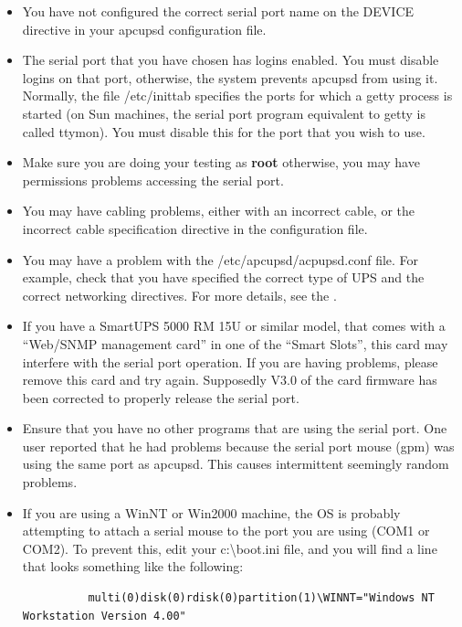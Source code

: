 {{{{{{{{{\begin{itemize}
\item You have not configured the correct serial port name on the DEVICE
   directive in your apcupsd configuration file.  
\item The serial port that you have chosen has logins enabled. You must
   disable logins on that port, otherwise, the system prevents apcupsd from using
   it. Normally, the file /etc/inittab specifies the ports for which a getty
process is started (on Sun machines, the serial port program equivalent to
getty is called ttymon). You must disable this for the port that you wish to
use.  
\item Make sure you are doing your testing as {\bf root} otherwise, you may
   have permissions problems accessing the serial port.  
\item You may have cabling problems, either with an incorrect cable, or the
   incorrect cable specification directive in the configuration file.  
\item You may have a problem with the /etc/apcupsd/acpupsd.conf file. For
   example, check that you have specified the correct type of UPS and the correct
   networking directives.  For more details, see the 
.  
\item If you have a SmartUPS 5000 RM 15U or similar model, that comes with a
   ``Web/SNMP management card'' in one of the ``Smart Slots'', this card may
   interfere with the serial port operation. If you are having problems, please
remove this card and try again. Supposedly V3.0 of the card firmware has been
corrected to properly release the serial port.  
\item Ensure that you have no other programs that are using the serial port.
   One user reported that he had problems because the serial port mouse (gpm) was
   using the same port as apcupsd. This causes intermittent seemingly random
problems.  
\item If you are using a WinNT or Win2000 machine, the OS is probably
   attempting to attach a serial mouse to the port you are using (COM1 or COM2).
   To prevent this, edit your c:\textbackslash{}boot.ini file, and you will find
a line that looks something like the following:  

\footnotesize
\begin{verbatim}
          multi(0)disk(0)rdisk(0)partition(1)\WINNT="Windows NT Workstation Version 4.00"
     
\end{verbatim}
\normalsize


\end{itemize}}}}}}}}}}
